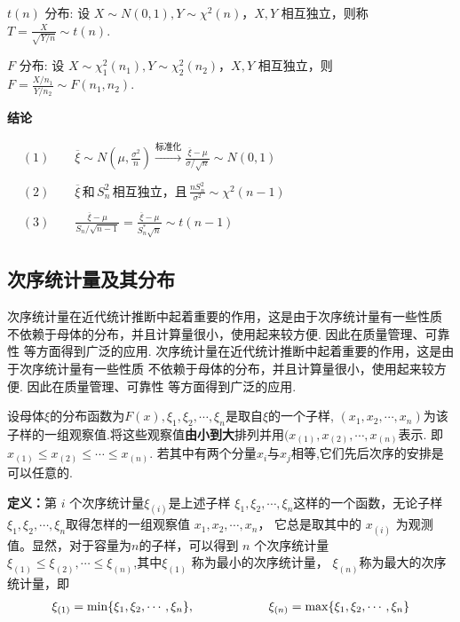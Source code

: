 $t(n)$ 分布: 设 $X \sim N(0,1), Y \sim \chi^2(n) ， X, Y$ 相互独立，则称 $T=\frac{X}{\sqrt{Y / n}} \sim t(n)$.

$F$ 分布: 设 $X \sim \chi_1^2\left(n_1\right), Y \sim \chi_2^2\left(n_2\right) ， X, Y$ 相互独立，则 $F=\frac{X / n_1}{Y / n_2} \sim F\left(n_1, n_2\right)$.


{\bf 结论}

$
\begin{aligned}
&(1)\qquad \overline{\xi}\sim N\left(\mu,\frac{\sigma^2}{n}\right) \xrightarrow{\mbox{标准化}} \frac{\overline{\xi}-\mu}{\sigma/\sqrt{n}}\sim N(0, 1)\\
\\
&(2)\qquad \overline{\xi}\, \mbox{和}\,S_n^2\,\mbox{相互独立，且}\, \frac{nS_n^2}{\sigma^2}\sim \chi^2(n-1)\\
\\
&(3)\qquad \frac{\overline{\xi}-\mu}{S_n/\sqrt{n -1}} = \frac{\overline{\xi}-\mu}{{S_n^*}\sqrt{n}}\sim t(n-1)
\end{aligned}
$




\subsection{次序统计量及其分布}
次序统计量在近代统计推断中起着重要的作用，这是由于次序统计量有一些性质
不依赖于母体的分布，并且计算量很小，使用起来较方便. 因此在质量管理、可靠性
等方面得到广泛的应用.
次序统计量在近代统计推断中起着重要的作用，这是由于次序统计量有一些性质
不依赖于母体的分布，并且计算量很小，使用起来较方便. 因此在质量管理、可靠性
等方面得到广泛的应用.

设母体$\xi$的分布函数为$F(x), \xi_1,\xi_2, \cdots,\xi_n$是取自$\xi$的一个子样,
$(x_1,x_2,\cdots, x_n)$为该子样的一组观察值.将这些观察值{\bf 由小到大}排列并用$(x_{(1)},x_{(2)},\cdots, x_{(n)}$表示.
即$x_{(1)}\le x_{(2)}\le \cdots\le x_{(n)}$. 若其中有两个分量$x_i$与$x_j$相等,它们先后次序的安排是可以任意的.

{\bf 定义：}第 $i$ 个次序统计量$\xi_{(i)}$是上述子样 $\xi_1, \xi_2, \cdots,\xi_n$这样的一个函数，无论子样 $\xi_1, \xi_2, \cdots,\xi_n$取得怎样的一组观察值 $x_1, x_2, \cdots, x_n$， 它总是取其中的 $x_{(i)}$ 为观测值。显然，对于容量为$n$的子样，可以得到 $n$ 个次序统计量 $\xi_{(1)}\le\xi_{(2)}, \cdots\le\xi_{(n)}$,其中$\xi_{(1)}$ 称为最小的次序统计量， $\xi_{(n)}$称为最大的次序统计量，即
\begin{align*}
\xi_{(1)} = \mathrm{min}\{\xi_1, \xi_2, \cdots,\xi_n\}, \hspace*{6em} \xi_{(n)} = \mathrm{max}\{\xi_1, \xi_2, \cdots,\xi_n\}
\end{align*}

